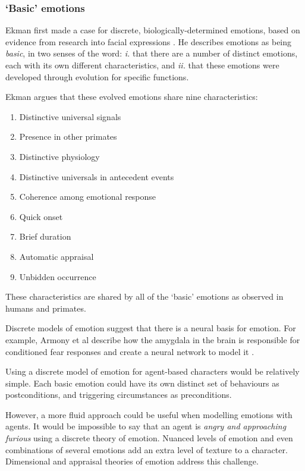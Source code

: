 \subsubsection{`Basic' emotions}
Ekman first made a case for discrete, biologically-determined emotions, based on evidence from research into facial expressions \citep{ekman1992argument}. He describes emotions as being \emph{basic}, in two senses of the word: \emph{i.} that there are a number of distinct emotions, each with its own different characteristics, and \emph{ii.} that these emotions were developed through evolution for specific functions.

Ekman argues that these evolved emotions share nine characteristics:

\begin{enumerate}
  \item Distinctive universal signals
  \item Presence in other primates
  \item Distinctive physiology
  \item Distinctive universals in antecedent events
  \item Coherence among emotional response
  \item Quick onset
  \item Brief duration
  \item Automatic appraisal
  \item Unbidden occurrence
\end{enumerate}

These characteristics are shared by all of the `basic' emotions as observed in humans and primates.

Discrete models of emotion suggest that there is a neural basis for emotion. For example, Armony et al describe how the amygdala in the brain is responsible for conditioned fear responses  and create a neural network to model it \citep{armony1997computational}.

Using a discrete model of emotion for agent-based characters would be relatively simple. Each basic emotion could have its own distinct set of behaviours as postconditions, and triggering circumstances as preconditions.

However, a more fluid approach could be useful when modelling emotions with agents. It would be impossible to say that an agent is \emph{angry and approaching furious} using a discrete theory of emotion. Nuanced levels of emotion and even combinations of several emotions add an extra level of texture to a character. Dimensional and appraisal theories of emotion address this challenge.

